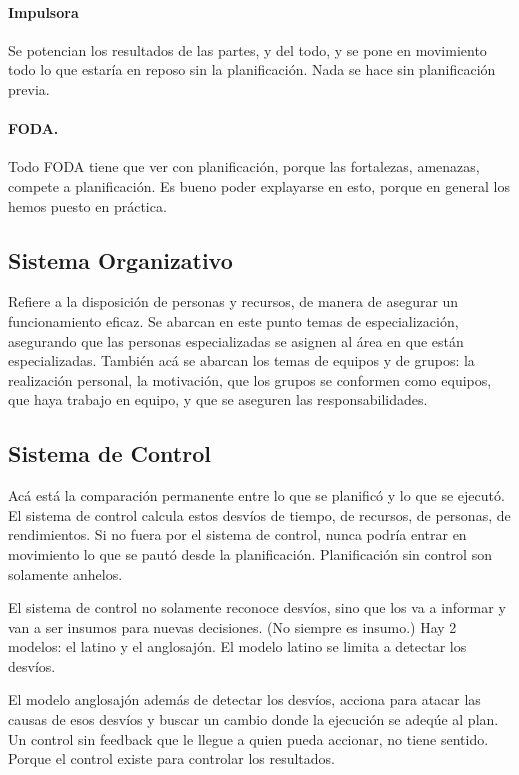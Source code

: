 \hypertarget{impulsora}{%
\paragraph{Impulsora}\label{impulsora}}
Se potencian los resultados de las
partes, y del todo, y se pone en movimiento todo lo que estaría en
reposo sin la planificación. Nada se hace sin planificación previa.

\paragraph*{FODA.} Todo FODA tiene que ver con planificación, porque las
fortalezas, amenazas, compete a planificación. Es bueno poder explayarse
en esto, porque en general los hemos puesto en práctica.

\hypertarget{sistema-organizativo}{%
\subsection{Sistema Organizativo}\label{sistema-organizativo}}

Refiere a la disposición de personas y recursos, de manera de asegurar
un funcionamiento eficaz. Se abarcan en este punto temas de
especialización, asegurando que las personas especializadas se asignen
al área en que están especializadas. También acá se abarcan los temas de
equipos y de grupos: la realización personal, la motivación, que los
grupos se conformen como equipos, que haya trabajo en equipo, y que se
aseguren las responsabilidades.

\hypertarget{sistema-de-control}{%
\subsection{Sistema de Control}\label{sistema-de-control}}

Acá está la comparación permanente entre lo que se planificó y lo que se
ejecutó. El sistema de control calcula estos desvíos de tiempo, de
recursos, de personas, de rendimientos. Si no fuera por el sistema de
control, nunca podría entrar en movimiento lo que se pautó desde la
planificación. Planificación sin control son solamente anhelos.

El sistema de control no solamente reconoce desvíos, sino que los va a
informar y van a ser insumos para nuevas decisiones. (No siempre es
insumo.) Hay 2 modelos: el latino y el anglosajón. El modelo latino se
limita a detectar los desvíos.

El modelo anglosajón además de detectar los desvíos, acciona para atacar
las causas de esos desvíos y buscar un cambio donde la ejecución se
adeqúe al plan. Un control sin feedback que le llegue a quien pueda
accionar, no tiene sentido. Porque el control existe para controlar los
resultados.

